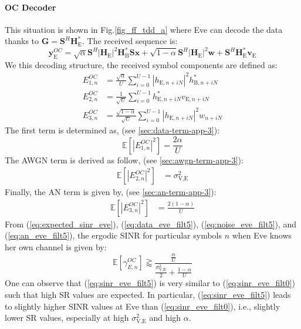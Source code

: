 \documentclass[journal,comsoc]{IEEEtran}
\newcommand{\module}[1]{\left|#1\right|}
\newcommand{\EX}[1]{\mathbb{E} \left[#1\right]}%
\newcommand{\HE}{\textbf{H}_{\text{E}}}
\newcommand{\HB}{\textbf{H}_{\text{B}}}
\newcommand{\ve}{\textbf{v}_{\text{E}}}
\newcommand{\spread}{\textbf{S}}
\newcommand{\w}{\textbf{w}}
\begin{document}
\paragraph{OC Decoder}
\label{sec:own-channel-knowledge}
This situation is shown in Fig.\ref{fig_ff_tdd_a} where Eve can decode the data thanks to $\textbf{G} = \spread^H \HE^*$. The received sequence is:
\begin{equation}
	\textbf{y}_{\text{E}}^{OC} = \sqrt{\alpha} \spread^H \module{\HE}^2 \HB^* \spread\textbf{x} +  \sqrt{1-\alpha} \spread^H \module{\HE}^2 \w  +  \spread^H  \HE^*  \ve
	\label{eq:rx_eve_filt5}
\end{equation}
We this decoding structure, the received symbol components are defined as:
\begin{equation}
\begin{split}
E_{1,n}^{OC} &= \frac{\sqrt{\alpha}}{U}\sum_{i=0}^{U-1}  \left|h_{\text{E}, n + iN}\right|^2  h_{\text{B}, n + iN}^* \\
E_{2,n}^{OC} &= \frac{1}{\sqrt{U}}\sum_{i=0}^{U-1} h^*_{\text{E}, n + iN}  v_{\text{E}, n + iN}\\
E_{3,n}^{OC} &=\frac{ \sqrt{1-\alpha}  }{\sqrt{U}}\sum_{i=0}^{U-1}   \left|h_{\text{E}, n + iN}\right|^2 w_{n + iN}
\end{split}
\end{equation}
The first term is determined as, (see \ref{sec:data-term-app-3}):
\begin{equation}
\EX{|E_{1,n}^{OC}|^2} = \frac{2\alpha}{U}
\label{eq:data_eve_filt5}
\end{equation}
The AWGN term is derived as follow, (see \ref{sec:awgn-term-app-3}):
\begin{equation}
\begin{split}
\EX{|E_{2,n}^{OC}|^2} &= \sigma^2_{\text{V,E}}
\end{split}
\label{eq:noise_eve_filt5}
\end{equation}
Finally, the AN term is given by, (see \ref{sec:an-term-app-3}):
\begin{equation}
\begin{split}
\EX{|E_{3,n}^{OC}|^2}  &=  \frac{2(1-\alpha)}{U}
\end{split}
\label{eq:an_eve_filt5}
\end{equation}
From (\ref{eq:expected_sinr_eve}), (\ref{eq:data_eve_filt5}), (\ref{eq:noise_eve_filt5}), and (\ref{eq:an_eve_filt5}),  the ergodic SINR for particular symbols $n$ when Eve knows her own channel is given by:
\begin{equation}
\EX{\gamma_{E,n}^{OC}} \gtrapprox \frac{\frac{\alpha }{U}}{\frac{\sigma^2_{\text{V,E}}}{2} + \frac{1-\alpha}{U}}
\label{eq:sinr_eve_filt5}
\end{equation}
One can observe that (\ref{eq:sinr_eve_filt5}) is very similar to (\ref{eq:sinr_eve_filt0}) such that high SR values are expected. In particular, (\ref{eq:sinr_eve_filt5}) leads to slightly higher SINR values at Eve than (\ref{eq:sinr_eve_filt0}), i.e., slightly lower SR values, especially at high $\sigma^2_{\text{V,E}}$ and high $\alpha$. 
\end{document}
